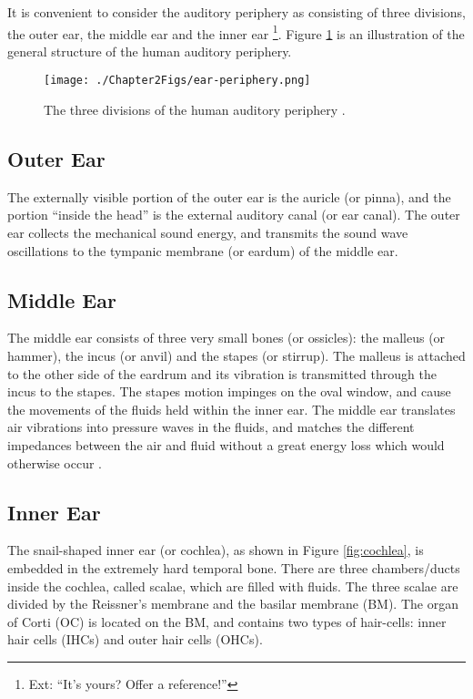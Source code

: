 \documentclass[11pt]{article}
\begin{document}
It is convenient to consider the auditory periphery as consisting of
three divisions, the outer ear, the middle ear and the inner ear \footnote{Ext: ``It's yours? Offer a reference!'' }.
Figure \ref{fig:ear-periphery} is an illustration of the general
structure of the human auditory periphery.

\begin{figure}[htb]
\centering
\texttt{[image: ./Chapter2Figs/ear-periphery.png]}
\caption{\label{fig:ear-periphery}The three divisions of the human auditory periphery \cite{BritannicaEarPeriphery}.}
\end{figure}
\subsection{Outer Ear}
\label{sec-2-1}
\label{sec:ch2-outer-ear}

The externally visible portion of the outer ear is the auricle (or
pinna), and the portion ``inside the head'' is the external auditory
canal (or ear canal). The outer ear collects the mechanical sound
energy, and transmits the sound wave oscillations to the tympanic
membrane (or eardum) of the middle ear.
\subsection{Middle Ear}
\label{sec-2-2}
\label{sec:ch2-middle-ear}

The middle ear consists of three very small bones (or ossicles): the
malleus (or hammer), the incus (or anvil) and the stapes (or stirrup).
The malleus is attached to the other side of the eardrum and its
vibration is transmitted through the incus to the stapes. The stapes
motion impinges on the oval window, and cause the movements of
the fluids held within the inner ear. The middle ear translates air
vibrations into pressure waves in the fluids, and matches the
different impedances between the air and fluid without a great energy
loss which would otherwise occur \cite{Zwicker1999}.
\subsection{Inner Ear}
\label{sec-2-3}
\label{sec:ch2-inner-ear}

The snail-shaped inner ear (or cochlea), as shown in
Figure \ref{fig:cochlea}, is embedded in the extremely hard temporal
bone. There are three chambers/ducts inside the cochlea, called
scalae, which are filled with fluids. The three scalae are divided by
the Reissner's membrane and the basilar membrane (BM). The organ of
Corti (OC) is located on the BM, and contains two types of hair-cells:
inner hair cells (IHCs) and outer hair cells (OHCs).
\end{document}
